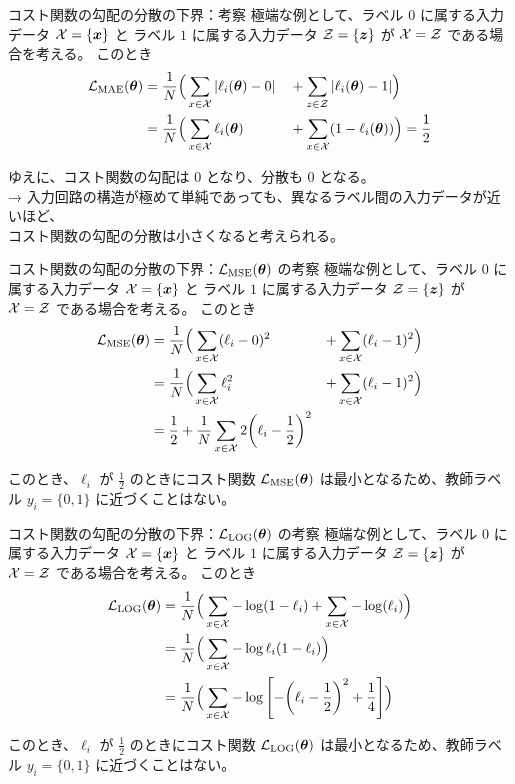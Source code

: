\documentclass[dvipdfmx,10pt,aspectratio=169]{beamer}
\begin{document}
\begin{frame}{コスト関数の勾配の分散の下界：考察}
    極端な例として、ラベル $0$ に属する入力データ $\mathcal{X} = \{\vb*{x}\}$ と ラベル $1$ に属する入力データ $\mathcal{Z} = \{\vb*{z}\}$ が $\mathcal{X} = \mathcal{Z}$ である場合を考える。
    このとき
    \begin{alignat*}{2}
        \mathcal{L}_{\mathrm{MAE}}(\vb*{\theta})
        &= \frac1N\Big(\sum_{x\in\mathcal{X}} |\ell_{i}(\vb*{\theta}) - 0| &&+ \sum_{z\in\mathcal{Z}} |\ell_{i}(\vb*{\theta}) - 1|\Big)\\
        &= \frac1N\Big(\sum_{x\in\mathcal{X}} \ell_{i}(\vb*{\theta})       &&+ \sum_{x\in\mathcal{X}} (1 - \ell_{i}(\vb*{\theta}))\Big) = \frac12
    \end{alignat*}
    
    ゆえに、コスト関数の勾配は $0$ となり、分散も $0$ となる。\\

    → 入力回路の構造が極めて単純であっても、異なるラベル間の入力データが近いほど、\\
    コスト関数の勾配の分散は小さくなると考えられる。
\end{frame}

\begin{frame}{コスト関数の勾配の分散の下界：$\mathcal{L}_{\mathrm{MSE}}(\vb*{\theta})$ の考察}
    極端な例として、ラベル $0$ に属する入力データ $\mathcal{X} = \{\vb*{x}\}$ と ラベル $1$ に属する入力データ $\mathcal{Z} = \{\vb*{z}\}$ が $\mathcal{X} = \mathcal{Z}$ である場合を考える。
    このとき
    \begin{alignat*}{2}
        \mathcal{L}_{\mathrm{MSE}}(\vb*{\theta})
        &= \frac1N\Big(\sum_{x\in\mathcal{X}} (\ell_{i} - 0)^2 &+ \sum_{x\in\mathcal{X}} (\ell_{i} - 1)^2\Big)\\
        &= \frac1N\Big(\sum_{x\in\mathcal{X}} \ell_{i}^2       &+ \sum_{x\in\mathcal{X}} (\ell_{i} - 1)^2\Big)\\
        &= \frac12 + \frac1N\sum_{x\in\mathcal{X}} 2\qty(\ell_i - \frac12)^2
    \end{alignat*}
    
    このとき、$\ell_i$ が $\frac12$ のときにコスト関数 $\mathcal{L}_{\mathrm{MSE}}(\vb*{\theta})$ は最小となるため、教師ラベル $y_i = \{0,1\}$ に近づくことはない。
\end{frame}

\begin{frame}{コスト関数の勾配の分散の下界：$\mathcal{L}_{\mathrm{LOG}}(\vb*{\theta})$ の考察}
    極端な例として、ラベル $0$ に属する入力データ $\mathcal{X} = \{\vb*{x}\}$ と ラベル $1$ に属する入力データ $\mathcal{Z} = \{\vb*{z}\}$ が $\mathcal{X} = \mathcal{Z}$ である場合を考える。
    このとき
    \begin{align*}
        \mathcal{L}_{\mathrm{LOG}}(\vb*{\theta})
        &= \frac1N\Big(\sum_{x\in\mathcal{X}} -\log(1-\ell_i) + \sum_{x\in\mathcal{X}} -\log(\ell_i)\Big)\\
        &= \frac1N\Big(\sum_{x\in\mathcal{X}} - \log\ell_i(1-\ell_i)\Big)\\
        &= \frac1N\Big(\sum_{x\in\mathcal{X}} - \log\qty[-\qty(\ell_i - \frac12)^2 + \frac14]\Big)
    \end{align*}
    
    このとき、$\ell_i$ が $\frac12$ のときにコスト関数 $\mathcal{L}_{\mathrm{LOG}}(\vb*{\theta})$ は最小となるため、教師ラベル $y_i = \{0,1\}$ に近づくことはない。
\end{frame}
\end{document}
